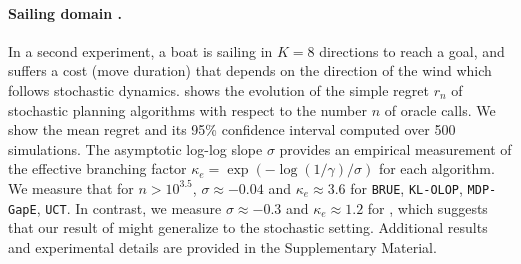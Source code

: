 \documentclass[runningheads]{llncs}
\begin{document}
\paragraph{Sailing domain \citep{Vanderbei1996}.}
In a second experiment, a boat is sailing in $K=8$ directions to reach a goal, and suffers a cost (move duration) that depends on the direction of the wind which follows stochastic dynamics.  shows the evolution of the simple regret $r_n$ of stochastic planning algorithms with respect to the number $n$ of oracle calls. We show the mean regret and its 95\% confidence interval computed over 500 simulations. The asymptotic log-log slope $\sigma$ provides an empirical measurement of the effective branching factor $\kappa_e = \exp(-\log(1/\gamma)/\sigma)$ for each algorithm. We measure that for $n>10^{3.5}$, $\sigma \approx-0.04$ and $\kappa_e \approx 3.6$ for \texttt{BRUE}, \texttt{KL-OLOP}, \texttt{MDP-GapE}, \texttt{UCT}. In contrast, we measure $\sigma \approx-0.3$ and $\kappa_e \approx 1.2$ for \GBOP, which suggests that our result of  might generalize to the stochastic setting. Additional results and experimental details are provided in the Supplementary Material.
\end{document}
